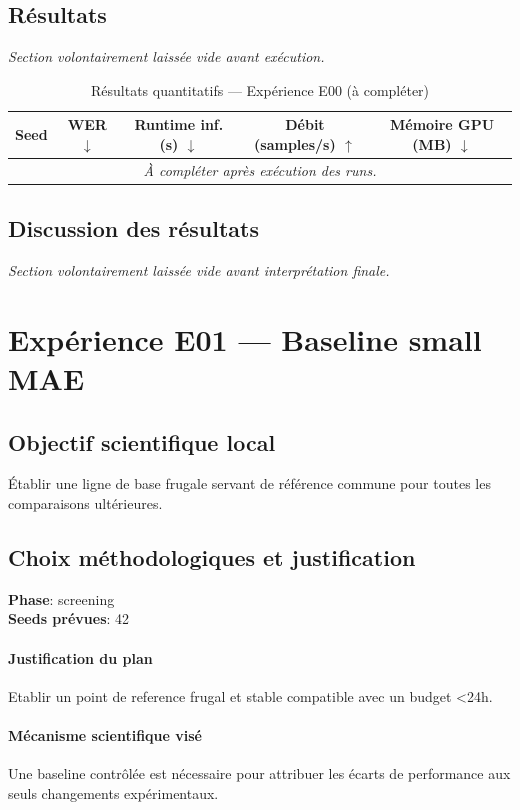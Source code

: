 \documentclass[11pt,a4paper]{article}
\begin{document}
\subsection{Résultats}
\textit{Section volontairement laissée vide avant exécution.}

\begin{table}[H]
\centering
\caption{Résultats quantitatifs --- Expérience E00 (à compléter)}
\begin{tabular}{lcccc}
\toprule
Seed & WER $\downarrow$ & Runtime inf. (s) $\downarrow$ & Débit (samples/s) $\uparrow$ & Mémoire GPU (MB) $\downarrow$ \\
\midrule
\multicolumn{5}{c}{\textit{À compléter après exécution des runs.}} \\
\bottomrule
\end{tabular}
\end{table}

\subsection{Discussion des résultats}
\textit{Section volontairement laissée vide avant interprétation finale.}


\section{Expérience E01 --- Baseline small MAE}
\subsection{Objectif scientifique local}
Établir une ligne de base frugale servant de référence commune pour toutes les comparaisons ultérieures.

\subsection{Choix méthodologiques et justification}
\textbf{Phase}: screening\\
\textbf{Seeds prévues}: 42\\


\paragraph{Justification du plan}
Etablir un point de reference frugal et stable compatible avec un budget <24h.

\paragraph{Mécanisme scientifique visé}
Une baseline contrôlée est nécessaire pour attribuer les écarts de performance aux seuls changements expérimentaux.
\end{document}
